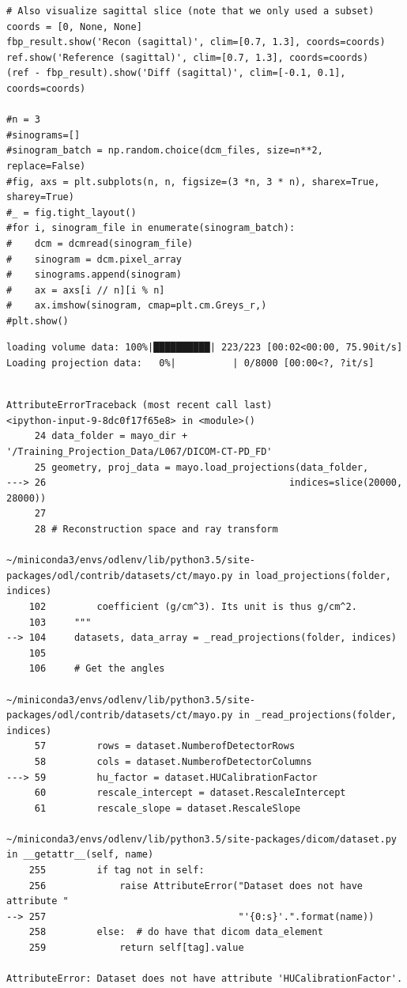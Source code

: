 \documentclass[a4paper, 11pt]{article}
\begin{document}
\begin{verbatim}
# Also visualize sagittal slice (note that we only used a subset)
coords = [0, None, None]
fbp_result.show('Recon (sagittal)', clim=[0.7, 1.3], coords=coords)
ref.show('Reference (sagittal)', clim=[0.7, 1.3], coords=coords)
(ref - fbp_result).show('Diff (sagittal)', clim=[-0.1, 0.1], coords=coords)

#n = 3
#sinograms=[]
#sinogram_batch = np.random.choice(dcm_files, size=n**2, replace=False)
#fig, axs = plt.subplots(n, n, figsize=(3 *n, 3 * n), sharex=True, sharey=True)
#_ = fig.tight_layout()
#for i, sinogram_file in enumerate(sinogram_batch):
#    dcm = dcmread(sinogram_file)
#    sinogram = dcm.pixel_array
#    sinograms.append(sinogram)
#    ax = axs[i // n][i % n]
#    ax.imshow(sinogram, cmap=plt.cm.Greys_r,)
#plt.show()
\end{verbatim}

\begin{verbatim}
loading volume data: 100%|██████████| 223/223 [00:02<00:00, 75.90it/s]
Loading projection data:   0%|          | 0/8000 [00:00<?, ?it/s]
\end{verbatim}

\begin{verbatim}

AttributeErrorTraceback (most recent call last)
<ipython-input-9-8dc0f17f65e8> in <module>()
     24 data_folder = mayo_dir + '/Training_Projection_Data/L067/DICOM-CT-PD_FD'
     25 geometry, proj_data = mayo.load_projections(data_folder,
---> 26                                           indices=slice(20000, 28000))
     27 
     28 # Reconstruction space and ray transform

~/miniconda3/envs/odlenv/lib/python3.5/site-packages/odl/contrib/datasets/ct/mayo.py in load_projections(folder, indices)
    102         coefficient (g/cm^3). Its unit is thus g/cm^2.
    103     """
--> 104     datasets, data_array = _read_projections(folder, indices)
    105 
    106     # Get the angles

~/miniconda3/envs/odlenv/lib/python3.5/site-packages/odl/contrib/datasets/ct/mayo.py in _read_projections(folder, indices)
     57         rows = dataset.NumberofDetectorRows
     58         cols = dataset.NumberofDetectorColumns
---> 59         hu_factor = dataset.HUCalibrationFactor
     60         rescale_intercept = dataset.RescaleIntercept
     61         rescale_slope = dataset.RescaleSlope

~/miniconda3/envs/odlenv/lib/python3.5/site-packages/dicom/dataset.py in __getattr__(self, name)
    255         if tag not in self:
    256             raise AttributeError("Dataset does not have attribute "
--> 257                                  "'{0:s}'.".format(name))
    258         else:  # do have that dicom data_element
    259             return self[tag].value

AttributeError: Dataset does not have attribute 'HUCalibrationFactor'.
\end{verbatim}
\end{document}
